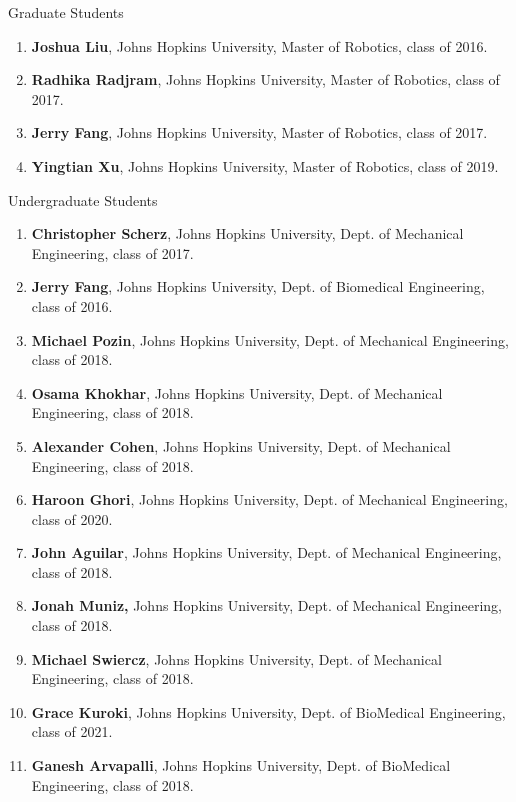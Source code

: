 

\begin{cvskills}

  \cvskill
    {Graduate Students} %
      {\begin{enumerate}
      		\item \textbf{Joshua Liu}, Johns Hopkins University, Master of Robotics, class of 2016.
    		\item \textbf{Radhika Radjram}, Johns Hopkins University, Master of Robotics, class of 2017.
    		\item\textbf{	Jerry Fang}, Johns Hopkins University, Master of Robotics, class of 2017.
    		\item \textbf{Yingtian Xu}, Johns Hopkins University, Master of Robotics, class of 2019.
    \end{enumerate}} %

  \cvskill
    {Undergraduate Students} %
    {\begin{enumerate}
    		\item \textbf{Christopher Scherz}, Johns Hopkins University, Dept. of Mechanical Engineering, class of 2017.
    		\item\textbf{	Jerry Fang}, Johns Hopkins University, Dept. of Biomedical Engineering, class of 2016.
    		\item \textbf{Michael Pozin}, Johns Hopkins University, Dept. of Mechanical Engineering, class of 2018.
    		\item \textbf{Osama Khokhar}, Johns Hopkins University, Dept. of Mechanical Engineering, class of 2018.
    		\item \textbf{Alexander Cohen}, Johns Hopkins University, Dept. of Mechanical Engineering, class of 2018.
    		\item \textbf{Haroon Ghori}, Johns Hopkins University, Dept. of Mechanical Engineering, class of 2020.
    		\item \textbf{John Aguilar}, Johns Hopkins University, Dept. of Mechanical Engineering, class of 2018.
    		\item \textbf{Jonah Muniz,} Johns Hopkins University, Dept. of Mechanical Engineering, class of 2018.
    		\item \textbf{Michael Swiercz}, Johns Hopkins University, Dept. of Mechanical Engineering, class of 2018.
    		\item \textbf{Grace Kuroki}, Johns Hopkins University, Dept. of BioMedical Engineering, class of 2021.
    		\item \textbf{Ganesh Arvapalli}, Johns Hopkins University, Dept. of BioMedical Engineering, class of 2018.
    \end{enumerate}} %
\end{cvskills}
